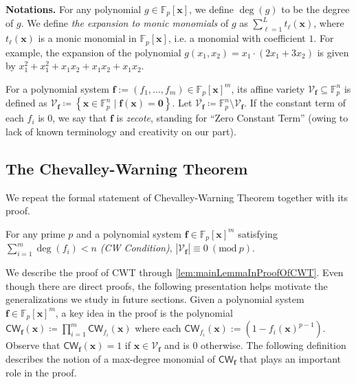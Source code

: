 \documentclass[10pt,a4paper]{article}
\theoremstyle{definition}
\theoremstyle{remark}
\newcommand{\inparen}[1]{\left ( #1 \right )}
\renewcommand{\mod}[1]{~\inparen{\mathrm{mod}~#1}}
\def\set#1{\left\{#1\right\}}
\newcommand{\paragr}[1]{\noindent \textbf{\boldmath #1}}
\newcommand{\bbF}{\ensuremath{\mathbb{F}}}
\newcommand{\calV}{\mathcal{V}}
\renewcommand{\vec}[1]{\boldsymbol{#1}}
\newcommand{\vecf}{\ensuremath{\boldsymbol{f}}}
\newcommand{\vecx}{\ensuremath{\boldsymbol{x}}}
\newcommand{\CWT}{CWT\xspace}
\newcommand{\CW}{\mathsf{CW}}
\begin{document}
\paragr{Notations.} For any polynomial $g \in \bbF_p[\vecx]$, we
define $\deg(g)$ to be the degree of $g$. We define
\textit{the expansion to monic monomials} of $g$ as $\sum_{\ell = 1}^L t_{\ell}(\vecx)$, 
where $t_{\ell}(\vecx)$ is a monic monomial in
$\bbF_p[\vecx]$, i.e. a monomial with coefficient $1$. For example,
the expansion of the polynomial
$g(x_1, x_2) = x_1 \cdot (2 x_1 + 3 x_2)$ is
given by $x_1^2 + x_1^2 + x_1 x_2 + x_1 x_2 + x_1 x_2$.

For a polynomial system $\vec{f} := (f_1, \ldots, f_m) \in \bbF_p[\vecx]^m$, its affine variety $\calV_{\vecf} \subseteq \bbF_p^n$ is defined as
$\calV_{\vecf} \coloneqq \set{\vecx \in \bbF_p^n \mid \vecf(\vecx) = \vec{0}}$.
Let $\overline{\calV_{\vecf}} \coloneqq \bbF_p^n \setminus \calV_{\vecf}$. If the constant term of each $f_i$ is $0$, we say that $\vecf$ is {\em zecote}, standing for ``Zero Constant Term'' (owing to lack of known terminology and creativity on our part).

  
\subsection{The Chevalley-Warning Theorem} \label{sec:ChevalleyWarningProof}

  We repeat the formal statement of Chevalley-Warning Theorem together with its
proof.

\begin{cwthm}[\cite{r15,r37}]
    For any prime $p$ and a polynomial system
  $\vecf \in \bbF_p[\vecx]^m$ satisfying $\sum_{i = 1}^m \deg(f_i) < n$
  \emph{(CW Condition)}, $|\calV_{\vecf}| \equiv 0 \mod{p}$.
\end{cwthm}

  We describe the proof of \CWT through \autoref{lem:mainLemmaInProofOfCWT}.
Even though there are direct proofs, the following presentation helps motivate the generalizations we study in future sections. Given a polynomial system $\vecf \in
\bbF_p[\vecx]^m$, a key idea in the proof is the polynomial $\CW_{\vecf}(\vecx)
\coloneqq \prod_{i = 1}^m \CW_{f_i}(\vecx)$ where each $\CW_{f_i}(\vecx) := (1 - f_i(\vecx)^{p - 1})$. Observe that $\CW_{\vecf}(\vecx) = 1$ if
$\vecx \in \calV_{\vecf}$ and is $0$ otherwise. The following definition
describes the notion of a max-degree monomial of $\CW_{\vecf}$ that plays an important role in the proof.
\end{document}
